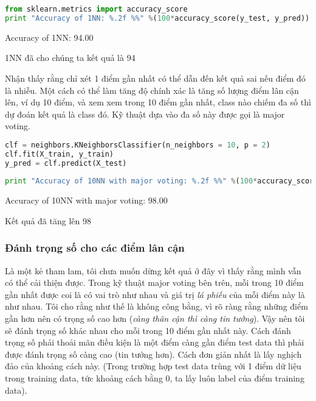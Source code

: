  
\begin{lstlisting}[language=Python]
from sklearn.metrics import accuracy_score 
print "Accuracy of 1NN: %.2f %%" %(100*accuracy_score(y_test, y_pred)) 
\end{lstlisting}
 
    Accuracy of 1NN: 94.00 %
 
 
1NN đã cho chúng ta kết quả là 94%
 
Nhận thấy rằng chỉ xét 1 điểm gần nhất có thể dẫn đến kết quả sai nếu điểm đó là nhiễu. Một cách có thể làm tăng độ chính xác là tăng số lượng điểm lân cận lên, ví dụ 10 điểm, và xem xem trong 10 điểm gần nhất, class nào chiếm đa số thì dự đoán kết quả là class đó. Kỹ thuật dựa vào đa số này được gọi là major voting.  
 
 
\begin{lstlisting}[language=Python]
clf = neighbors.KNeighborsClassifier(n_neighbors = 10, p = 2) 
clf.fit(X_train, y_train) 
y_pred = clf.predict(X_test) 
 
print "Accuracy of 10NN with major voting: %.2f %%" %(100*accuracy_score(y_test, y_pred)) 
\end{lstlisting}
 
    Accuracy of 10NN with major voting: 98.00 %
 
 
Kết quả đã tăng lên 98%
 
 
 
\subsubsection{Đánh trọng số cho các điểm lân cận}
 
Là một kẻ tham lam, tôi chưa muốn dừng kết quả ở đây vì thấy rằng mình vẫn có thể cải thiện được. Trong kỹ thuật major voting bên trên, mỗi trong 10 điểm gần nhất được coi là có vai trò như nhau và giá trị \textit{lá phiếu} của mỗi điểm này là như nhau. Tôi cho rằng như thế là không công bằng, vì rõ ràng rằng những điểm gần hơn nên có trọng số cao hơn (\textit{càng thân cận thì càng tin tưởng}). Vậy nên tôi sẽ đánh trọng số khác nhau cho mỗi trong 10 điểm gần nhất này. Cách đánh trọng số phải thoải mãn điều kiện là một điểm càng gần điểm test data thì phải được đánh trọng số càng cao (tin tưởng hơn). Cách đơn giản nhất là lấy nghịch đảo của khoảng cách này. (Trong trường hợp test data trùng với 1 điểm dữ liệu trong training data, tức khoảng cách bằng 0, ta lấy luôn label của điểm training data).  
 
